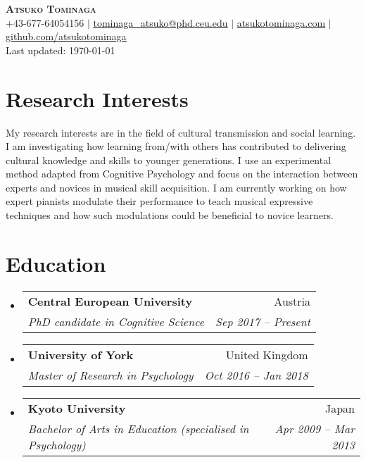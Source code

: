 \documentclass[letterpaper,11pt]{article}
\makeatletter
\newcommand{\resumeSubheading}[4]{
  \vspace{-2pt}\item
    \begin{tabular*}{0.97\textwidth}[t]{l@{\extracolsep{\fill}}r}
      \textbf{#1} & #2 \\
      \textit{\small#3} & \textit{\small #4} \\
    \end{tabular*}\vspace{-7pt}
}
\newcommand{\resumeSubHeadingListStart}{\begin{itemize}[leftmargin=0.15in, label={}]}
\newcommand{\resumeSubHeadingListEnd}{\end{itemize}}
\makeatother
\begin{document}

\begin{center}
    \textbf{\Huge \scshape Atsuko Tominaga} \\ \vspace{10pt}
    \small +43-677-64054156 $|$ \href{mailto:tominaga_atsuko@phd.ceu.edu}{\underline{tominaga\_atsuko@phd.ceu.edu}} $|$ 
    \href{https://atsukotominaga.com/}{\underline{atsukotominaga.com}} $|$
    \href{https://github.com/atsukotominaga}{\underline{github.com/atsukotominaga}} \\ \vspace{10pt}
    \small Last updated: \today
\end{center}

\section{Research Interests}

\small{My research interests are in the field of cultural transmission and social learning. I am investigating how learning from/with others has contributed to delivering cultural knowledge and skills to younger generations. I use an experimental method adapted from Cognitive Psychology and focus on the interaction between experts and novices in musical skill acquisition. I am currently working on how expert pianists modulate their performance to teach musical expressive techniques and how such modulations could be beneficial to novice learners.}

\section{Education}
  \resumeSubHeadingListStart
    \resumeSubheading
      {Central European University}{Austria}
      {PhD candidate in Cognitive Science}{Sep 2017 -- Present}
    \resumeSubheading
      {University of York}{United Kingdom}
      {Master of Research in Psychology}{Oct 2016 -- Jan 2018}
    \resumeSubheading
      {Kyoto University}{Japan}
      {Bachelor of Arts in Education (specialised in Psychology)}{Apr 2009 -- Mar 2013}
  \resumeSubHeadingListEnd
\end{document}
